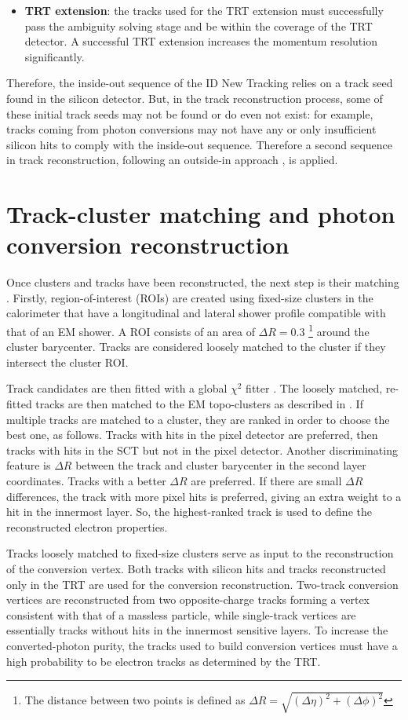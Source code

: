 \documentclass[a4paper, oneside, 11pt, openright]{book}
\begin{document}
\begin{itemize}
				\item \textbf{TRT extension}: the tracks used for the TRT extension must successfully pass the ambiguity solving stage and be within the coverage of the TRT detector. A successful TRT extension increases the momentum resolution significantly.
			\end{itemize}
			Therefore, the inside-out sequence of the ID New Tracking relies on a track seed found in the silicon detector. But, in the track reconstruction process, some of these initial track seeds may not be found or do even not exist: for example, tracks coming from photon conversions may not have any or only insufficient silicon hits to comply with the inside-out sequence. Therefore a second sequence in track reconstruction, following an outside-in approach \cite{inside_out_inside}, is applied.
			
		\section{Track-cluster matching and photon conversion reconstruction}
			Once clusters and tracks have been reconstructed, the next step is their matching \cite{Aad_2019}. Firstly, region-of-interest (ROIs) are created using fixed-size clusters in the calorimeter that have a longitudinal and lateral shower profile compatible with that of an EM shower. A ROI consists of an area of $\Delta R = 0.3$ \footnote{The distance between two points is defined as $\Delta R = \sqrt{(\Delta\eta)^2+(\Delta\phi)^2}$} around the cluster barycenter. Tracks are considered loosely matched to the cluster if they intersect the cluster ROI.
			
			Track candidates are then fitted with a global $\chi^2$ fitter \cite{ChiQuadro}. The loosely matched, re-fitted tracks are then matched to the EM topo-clusters as described in \cite{Aad_2019}. If multiple tracks are matched to a cluster, they are ranked in order to choose the best one, as follows. Tracks with hits in the pixel detector are preferred, then tracks with hits in the SCT but not in the pixel detector. Another discriminating feature is $\Delta R$ between the track and cluster barycenter in the second layer coordinates. Tracks with a better $\Delta R$ are preferred. If there are small $\Delta R$ differences, the track with more pixel hits is preferred, giving an extra weight to a hit in the innermost layer. So, the highest-ranked track is used to define the reconstructed electron properties.
			
			Tracks loosely matched to fixed-size clusters serve as input to the reconstruction of the conversion vertex. Both tracks with silicon hits and tracks reconstructed only in the TRT are used for the conversion reconstruction. Two-track conversion vertices are reconstructed from two opposite-charge tracks forming a vertex consistent with that of a massless particle, while single-track vertices are essentially tracks without hits in the innermost sensitive layers. To increase the converted-photon purity, the tracks used to build conversion vertices must have a high probability to be electron tracks as determined by the TRT.
			
\end{document}
